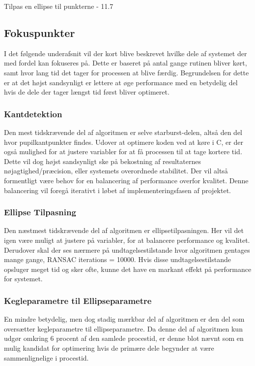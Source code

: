 \documentclass[analyse.tex]{subfiles}
\begin{document}
Tilpas en ellipse til punkterne - 11.7%

\subsection{Fokuspunkter}
I det følgende underafsnit vil der kort blive beskrevet hvilke dele af systemet der med fordel kan fokuseres på. Dette er baseret på antal gange rutinen bliver kørt, samt hvor lang tid det tager for processen at blive færdig. Begrundelsen for dette er at det højst sandsynligt er lettere at øge performance med en betydelig del hvis de dele der tager længst tid først bliver optimeret.

\subsubsection{Kantdetektion}
Den mest tidskrævende del af algoritmen er selve starburst-delen, altså den del hvor pupilkantpunkter findes. Udover at optimere koden ved at køre i C, er der også mulighed for at justere variabler for at få processen til at tage kortere tid. Dette vil dog højst sandsynligt ske på bekostning af resultaternes nøjagtighed/præcision, eller systemets overordnede stabilitet. Der vil altså formentligt være behov for en balancering af performance overfor kvalitet. Denne balancering vil foregå iterativt i løbet af implementeringsfasen af projektet.

\subsubsection{Ellipse Tilpasning}
Den næstmest tidskrævende del af algoritmen er ellipsetilpasningen. Her vil det igen være muligt at justere på variabler, for at balancere performance og kvalitet. Derudover skal der ses nærmere på undtagelsestilstande hvor algoritmen gentages mange gange, RANSAC iterations = 10000. Hvis disse undtagelsestilstande opsluger meget tid og sker ofte, kunne det have en markant effekt på performance for systemet.

\subsubsection{Kegleparametre til Ellipseparametre}
En mindre betydelig, men dog stadig mærkbar del af algoritmen er den del som oversætter kegleparametre til ellipseparametre. Da denne del af algoritmen kun udgør omkring 6 procent af den samlede procestid, er denne blot nævnt som en mulig kandidat for optimering hvis de primære dele begynder at være sammenlignelige i procestid. 
\end{document}
